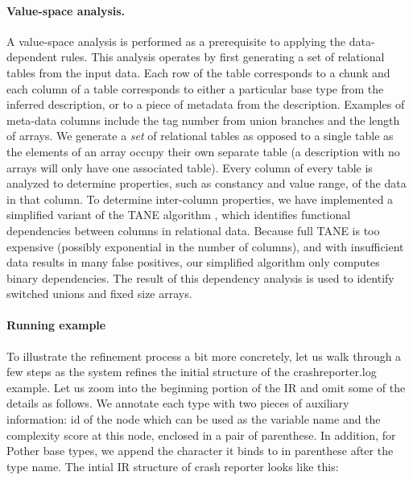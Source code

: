 \paragraph*{Value-space analysis.}
A value-space analysis is performed as a prerequisite 
to applying the data-dependent rules.
This analysis operates by first generating a set of relational tables
from the input data.
Each row of the table corresponds to a chunk and each column of a table
corresponds to either a particular base type from the inferred description,
or to a piece of metadata from the description.  Examples of meta-data
columns include the tag number from union branches and the length of arrays.
We generate a {\em set} of relational tables as opposed to a single table
as the elements of an array occupy their own separate table (a description 
with no arrays will only have one associated table).
Every column of every table is analyzed to determine properties,
such as constancy and value range, of the data in that column.
To determine inter-column properties, we have implemented a simplified
variant of the TANE algorithm \cite{TANE-HKPT99},
which identifies functional dependencies between columns in 
relational data.  Because full TANE is too expensive 
(possibly exponential in the number of columns), 
and with insufficient data results in many false positives, 
our simplified algorithm only computes binary dependencies. The 
result of this dependency analysis is used to 
identify switched unions and fixed size arrays.

\paragraph*{Running example}
To illustrate the refinement process a bit more concretely, let us walk through
a few steps as the system refines the initial structure of the crashreporter.log example.
Let us zoom into the beginning portion of the IR and omit some of the details as follows. 
We annotate each type with two pieces of auxiliary information: id of the node which
can be used as the variable name and the complexity score at this node, 
enclosed in a pair of parenthese. In addition, for Pother base types,
we append the character it binds to in parenthese after the type name.
The intial IR structure of crash reporter looks like this:

